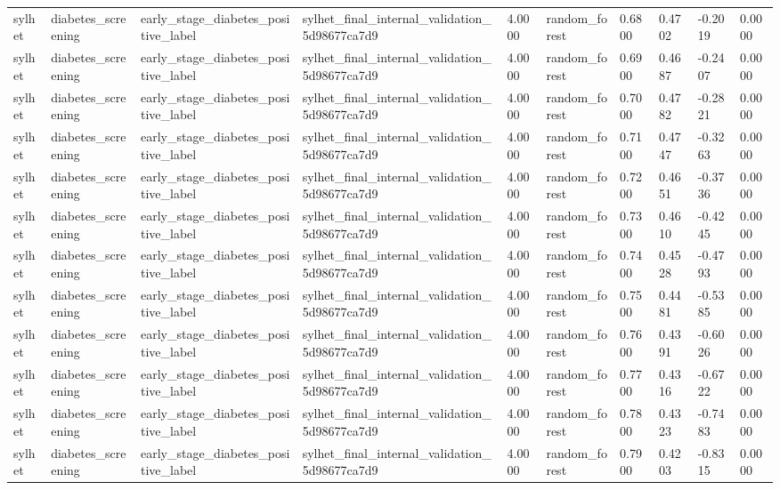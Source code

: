 \begin{tabular}{llllllllll}
sylhet & diabetes\_screening & early\_stage\_diabetes\_positive\_label & sylhet\_final\_internal\_validation\_5d98677ca7d9 & 4.0000 & random\_forest & 0.6800 & 0.4702 & -0.2019 & 0.0000 \\
sylhet & diabetes\_screening & early\_stage\_diabetes\_positive\_label & sylhet\_final\_internal\_validation\_5d98677ca7d9 & 4.0000 & random\_forest & 0.6900 & 0.4687 & -0.2407 & 0.0000 \\
sylhet & diabetes\_screening & early\_stage\_diabetes\_positive\_label & sylhet\_final\_internal\_validation\_5d98677ca7d9 & 4.0000 & random\_forest & 0.7000 & 0.4782 & -0.2821 & 0.0000 \\
sylhet & diabetes\_screening & early\_stage\_diabetes\_positive\_label & sylhet\_final\_internal\_validation\_5d98677ca7d9 & 4.0000 & random\_forest & 0.7100 & 0.4747 & -0.3263 & 0.0000 \\
sylhet & diabetes\_screening & early\_stage\_diabetes\_positive\_label & sylhet\_final\_internal\_validation\_5d98677ca7d9 & 4.0000 & random\_forest & 0.7200 & 0.4651 & -0.3736 & 0.0000 \\
sylhet & diabetes\_screening & early\_stage\_diabetes\_positive\_label & sylhet\_final\_internal\_validation\_5d98677ca7d9 & 4.0000 & random\_forest & 0.7300 & 0.4610 & -0.4245 & 0.0000 \\
sylhet & diabetes\_screening & early\_stage\_diabetes\_positive\_label & sylhet\_final\_internal\_validation\_5d98677ca7d9 & 4.0000 & random\_forest & 0.7400 & 0.4528 & -0.4793 & 0.0000 \\
sylhet & diabetes\_screening & early\_stage\_diabetes\_positive\_label & sylhet\_final\_internal\_validation\_5d98677ca7d9 & 4.0000 & random\_forest & 0.7500 & 0.4481 & -0.5385 & 0.0000 \\
sylhet & diabetes\_screening & early\_stage\_diabetes\_positive\_label & sylhet\_final\_internal\_validation\_5d98677ca7d9 & 4.0000 & random\_forest & 0.7600 & 0.4391 & -0.6026 & 0.0000 \\
sylhet & diabetes\_screening & early\_stage\_diabetes\_positive\_label & sylhet\_final\_internal\_validation\_5d98677ca7d9 & 4.0000 & random\_forest & 0.7700 & 0.4316 & -0.6722 & 0.0000 \\
sylhet & diabetes\_screening & early\_stage\_diabetes\_positive\_label & sylhet\_final\_internal\_validation\_5d98677ca7d9 & 4.0000 & random\_forest & 0.7800 & 0.4323 & -0.7483 & 0.0000 \\
sylhet & diabetes\_screening & early\_stage\_diabetes\_positive\_label & sylhet\_final\_internal\_validation\_5d98677ca7d9 & 4.0000 & random\_forest & 0.7900 & 0.4203 & -0.8315 & 0.0000 \\

\end{tabular}
